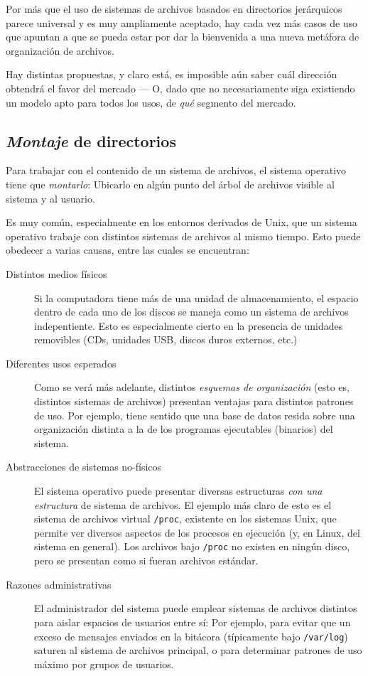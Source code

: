 \documentclass[11pt,fleqn]{book} %
\begin{document}
Por más que el uso de sistemas de archivos basados en directorios
jerárquicos parece universal y es muy ampliamente aceptado, hay cada
vez más casos de uso que apuntan a que se pueda estar por dar la
bienvenida a una nueva metáfora de organización de archivos.

Hay distintas propuestas, y claro está, es imposible aún saber cuál
dirección obtendrá el favor del mercado — O, dado que no
necesariamente siga existiendo un modelo apto para todos los usos, de
\emph{qué} segmento del mercado.
\subsection{\emph{Montaje} de directorios}
\label{sec-6-3-3}
\label{DIR_montaje_directorios}


Para trabajar con el contenido de un sistema de archivos, el sistema
operativo tiene que \emph{montarlo}: Ubicarlo en algún punto del árbol de
archivos visible al sistema y al usuario.

Es muy común, especialmente en los entornos derivados de Unix, que un
sistema operativo trabaje con distintos sistemas de archivos al mismo
tiempo. Esto puede obedecer a varias causas, entre las cuales se
encuentran:

\begin{description}
\item[Distintos medios físicos] Si la computadora tiene más de una
     unidad de almacenamiento, el espacio dentro de cada uno de los
     discos se maneja como un sistema de archivos indepentiente. Esto
     es especialmente cierto en la presencia de unidades removibles
     (CDs, unidades USB, discos duros externos, etc.)
\item[Diferentes usos esperados] Como se verá más adelante, distintos
     \emph{esquemas de organización} (esto es, distintos sistemas de
     archivos) presentan ventajas para distintos patrones de uso. Por
     ejemplo, tiene sentido que una base de datos resida sobre una
     organización distinta a la de los programas ejecutables (binarios) del
     sistema.
\item[Abstracciones de sistemas no-físicos] El sistema operativo puede
     presentar diversas estructuras \emph{con una estructura} de sistema de
     archivos. El ejemplo más claro de esto es el sistema de archivos
     virtual \texttt{/proc}, existente en los sistemas Unix, que permite ver
     diversos aspectos de los procesos en ejecución (y, en Linux, del
     sistema en general). Los archivos bajo \texttt{/proc} no existen en
     ningún disco, pero se presentan como si fueran archivos estándar.
\item[Razones administrativas] El administrador del sistema puede
     emplear sistemas de archivos distintos para aislar espacios de
     usuarios entre sí: Por ejemplo, para evitar que un exceso de
     mensajes enviados en la bitácora (típicamente bajo \texttt{/var/log})
     saturen al sistema de archivos principal, o para determinar
     patrones de uso máximo por grupos de usuarios.
\end{description}
\end{document}

